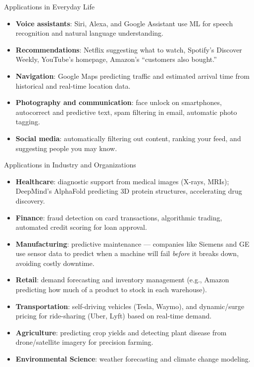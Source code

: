\begin{frame}{Applications in Everyday Life}
	\begin{itemize}
		\item \textbf{Voice assistants}: Siri, Alexa, and Google Assistant use ML for speech recognition and natural language understanding.
		\item \textbf{Recommendations}: Netflix suggesting what to watch, Spotify's Discover Weekly, YouTube's homepage, Amazon's ``customers also bought.''
		\item \textbf{Navigation}: Google Maps predicting traffic and estimated arrival time from historical and real-time location data.
		\item \textbf{Photography and communication}: face unlock on smartphones, autocorrect and predictive text, spam filtering in email, automatic photo tagging.
		\item \textbf{Social media}: automatically filtering out content, ranking your feed, and suggesting people you may know.
	\end{itemize}
\end{frame}


\begin{frame}[allowframebreaks]{Applications in Industry and Organizations}
	\begin{itemize}
	\item \textbf{Healthcare}: diagnostic support from medical images (X-rays, MRIs); DeepMind's AlphaFold predicting 3D protein structures, accelerating drug discovery.
	\item \textbf{Finance}: fraud detection on card transactions, algorithmic trading, automated credit scoring for loan approval.
	\item \textbf{Manufacturing}: predictive maintenance --- companies like Siemens and GE use sensor data to predict when a machine will fail \emph{before} it breaks down, avoiding costly downtime.
	\item \textbf{Retail}: demand forecasting and inventory management (e.g., Amazon predicting how much of a product to stock in each warehouse).
	\item \textbf{Transportation}: self-driving vehicles (Tesla, Waymo), and dynamic/surge pricing for ride-sharing (Uber, Lyft) based on real-time demand.
	\item \textbf{Agriculture}: predicting crop yields and detecting plant disease from drone/satellite imagery for precision farming.
	\item \textbf{Environmental Science}: weather forecasting and climate change modeling.
	\end{itemize}
\end{frame}


